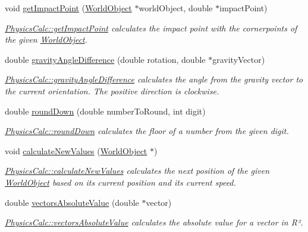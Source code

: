 \begin{DoxyCompactItemize}
void \hyperlink{class_physics_calc_a9bbfe3998836451d84697577c0e6195d}{get\+Impact\+Point} (\hyperlink{class_world_object}{World\+Object} $\ast$world\+Object, double $\ast$impact\+Point)
\begin{DoxyCompactList}\small\item\em \hyperlink{class_physics_calc_a9bbfe3998836451d84697577c0e6195d}{Physics\+Calc\+::get\+Impact\+Point} calculates the impact point with the cornerpoints of the given \hyperlink{class_world_object}{World\+Object}. \end{DoxyCompactList}\item 
double \hyperlink{class_physics_calc_a515dcab8395108cb37b7526adbab6ed0}{gravity\+Angle\+Difference} (double rotation, double $\ast$gravity\+Vector)
\begin{DoxyCompactList}\small\item\em \hyperlink{class_physics_calc_a515dcab8395108cb37b7526adbab6ed0}{Physics\+Calc\+::gravity\+Angle\+Difference} calculates the angle from the gravity vector to the current orientation. The positive direction is clockwise. \end{DoxyCompactList}\item 
double \hyperlink{class_physics_calc_a7e24e0769598a509705a71a0c4e8ab5d}{round\+Down} (double number\+To\+Round, int digit)
\begin{DoxyCompactList}\small\item\em \hyperlink{class_physics_calc_a7e24e0769598a509705a71a0c4e8ab5d}{Physics\+Calc\+::round\+Down} calculates the floor of a number from the given digit. \end{DoxyCompactList}\item 
void \hyperlink{class_physics_calc_a8d6de304c47a3b6be6fdfd7bacd3dcd2}{calculate\+New\+Values} (\hyperlink{class_world_object}{World\+Object} $\ast$)
\begin{DoxyCompactList}\small\item\em \hyperlink{class_physics_calc_a8d6de304c47a3b6be6fdfd7bacd3dcd2}{Physics\+Calc\+::calculate\+New\+Values} calculates the next position of the given \hyperlink{class_world_object}{World\+Object} based on it\textquotesingle{}s current position and its current speed. \end{DoxyCompactList}\item 
double \hyperlink{class_physics_calc_a5915904f1743c3a6cca6cf2b72a8d6f5}{vectors\+Absolute\+Value} (double $\ast$vector)
\begin{DoxyCompactList}\small\item\em \hyperlink{class_physics_calc_a5915904f1743c3a6cca6cf2b72a8d6f5}{Physics\+Calc\+::vectors\+Absolute\+Value} calculates the absolute value for a vector in R². \end{DoxyCompactList}\item 

\end{DoxyCompactItemize}
